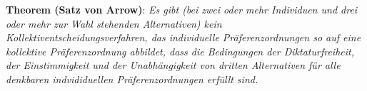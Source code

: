 \begin{enumerate}
  
  
 
\end{enumerate}


{\bf Theorem (Satz von Arrow)}: {\em Es gibt (bei zwei
oder mehr Individuen und drei oder mehr zur Wahl stehenden Alternativen) kein
Kollektiventscheidungsverfahren, das individuelle Präferenzordnungen so auf eine
kollektive Präferenzordnung abbildet, dass die Bedingungen der Diktaturfreiheit,
der Ein\-stim\-migkeit und der Unabhängigkeit von dritten Alternativen für alle
denk\-bar\-en indvididuellen Präferenzordnungen erfüllt sind.}
~\\

